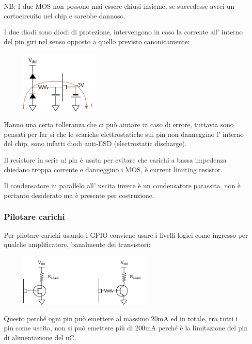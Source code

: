 NB: I due MOS non possono mai essere chiusi insieme, se succedesse avrei un cortocircuito nel chip e sarebbe dannoso.

I due diodi sono diodi di protezione, intervengono in caso la corrente all' interno del pin giri nel senso opposto a quello previsto canonicamente:
\begin{figure}[H]
    \centering
    \includegraphics[width=150px]{images/21_GPIO/protection_diode.png}
\end{figure}
Hanno una certa tolleranza che ci può aiutare in caso di errore, tuttavia sono pensati per far si che le scariche elettrostatiche sui pin non danneggino l' interno del chip, sono infatti diodi anti-ESD (electrostatic discharge).

Il resistore in serie al pin è usata per evitare che carichi a bassa impedenza chiedano troppa corrente e danneggino i MOS, è current limiting resistor.

Il condensatore in parallelo all' uscita invece è un condensatore parassita, non è pertanto desiderato ma è presente per costruzione.

\subsubsection{Pilotare carichi}
Per pilotare carichi usando i GPIO conviene usare i livelli logici come ingresso per qualche amplificatore, banalmente dei transistori:
\begin{figure}[H]
    \centering
    \includegraphics[width=250px]{images/21_GPIO/pilotare_carichi.png}
\end{figure}
Questo perché ogni pin può emettere al massimo 20mA ed in totale, tra tutti i pin come uscita, non si può emettere più di 200mA perché è la limitazione del pin di alimentazione del uC.

